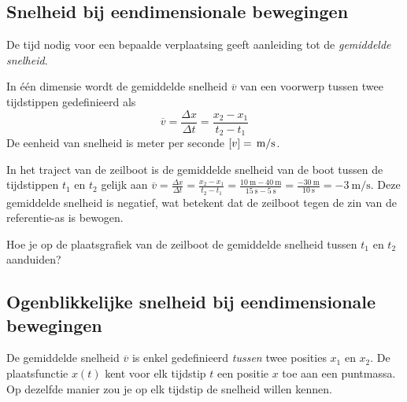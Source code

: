 \documentclass{ximera}
\begin{document}
\subsection*{Snelheid bij eendimensionale bewegingen}



De tijd nodig voor een bepaalde verplaatsing geeft aanleiding tot de \textit{gemiddelde snelheid}. 


\begin{definition}
	
In één dimensie wordt de gemiddelde snelheid $\overline{v}$ van een voorwerp tussen twee tijdstippen gedefinieerd als
\[
\overline{v}=\frac{\Delta x}{\Delta t}=\frac{x_2-x_1}{t_2-t_1}
\]
De eenheid van snelheid is meter per seconde $[v]=\rm\,m/s$. 
\end{definition}


In het traject van de zeilboot is de gemiddelde snelheid van de boot tussen de tijdstippen $t_1$ en $t_2$ gelijk aan 
$\overline{v} =\frac{\Delta x}{\Delta t} =\frac{x_2-x_1}{t_2-t_1}=\frac{\SI{10}{\meter} - \SI{40}{\meter}}{\SI{15}{\second} - \SI{5}{\second}}= \frac{\SI{-30}{\meter}}{\SI{10}{\second}} = \SI{-3}{\meter\per\second}$. 
Deze gemiddelde snelheid is negatief, wat betekent dat de zeilboot tegen de zin van de referentie-as is bewogen. 


\begin{quickquestion*}{}{}
Hoe je op de plaatsgrafiek van de zeilboot de gemiddelde snelheid tussen \(t_1\) en \(t_2\) aanduiden? 
\end{quickquestion*}



\subsection*{Ogenblikkelijke snelheid bij eendimensionale bewegingen}

De gemiddelde snelheid \(\overline{v}\) is enkel gedefinieerd \textit{tussen} twee posities \(x_1\) en \(x_2\). 
De plaatsfunctie \(x(t)\) kent voor elk tijdstip \(t\) een positie \(x\) toe aan een puntmassa. Op dezelfde manier zou je op elk tijdstip de snelheid willen kennen. 
\end{document}
